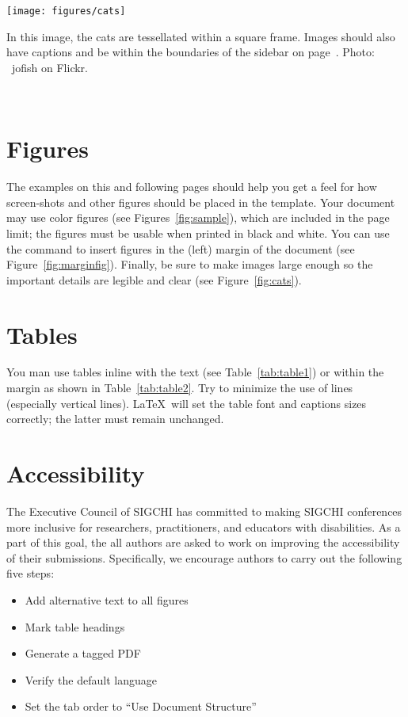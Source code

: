 \documentclass{sigchi-ext}
\begin{document}

\begin{marginfigure}[-35pc]
  \begin{minipage}{\marginparwidth}
    \centering
    \texttt{[image: figures/cats]}
    \caption{In this image, the cats are tessellated within a square
      frame. Images should also have captions and be within the
      boundaries of the sidebar on page~\pageref{sec:sidebar}. Photo:
      \cczero~jofish on Flickr.}~\label{fig:marginfig}
  \end{minipage}
\end{marginfigure}

\section{Figures}
The examples on this and following pages should help you get a feel
for how screen-shots and other figures should be placed in the
template. Your document may use color figures (see
Figures~\ref{fig:sample}), which are included in the page limit; the
figures must be usable when printed in black and white. You can use
the \texttt{\marginpar} command to insert figures in the (left) margin
of the document (see Figure~\ref{fig:marginfig}). Finally, be sure to
make images large enough so the important details are legible and
clear (see Figure~\ref{fig:cats}).

\section{Tables}
You man use tables inline with the text (see Table~\ref{tab:table1})
or within the margin as shown in Table~\ref{tab:table2}. Try to
minimize the use of lines (especially vertical lines). \LaTeX\ will
set the table font and captions sizes correctly; the latter must
remain unchanged.

\section{Accessibility}
The Executive Council of SIGCHI has committed to making SIGCHI
conferences more inclusive for researchers, practitioners, and
educators with disabilities. As a part of this goal, the all authors
are asked to work on improving the accessibility of their
submissions. Specifically, we encourage authors to carry out the
following five steps:
\begin{itemize}\compresslist%
\item Add alternative text to all figures
\item Mark table headings
\item Generate a tagged PDF
\item Verify the default language
\item Set the tab order to ``Use Document Structure''
\end{itemize}
\end{document}
